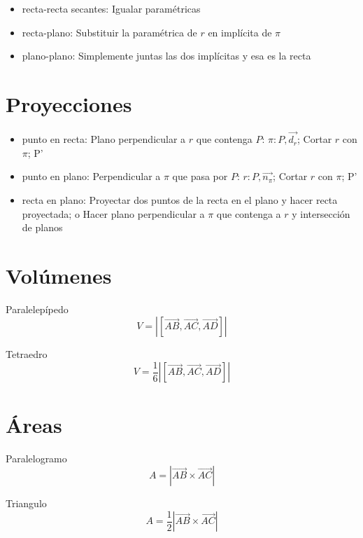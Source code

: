 \documentclass[12pt, letterpaper, twoside]{article}
\begin{document}
	\begin{itemize}
		\item recta-recta secantes:
		Igualar paramétricas
		
		\item recta-plano:
		Substituir la paramétrica de $r$ en implícita de $\pi$
		
		\item plano-plano:
		Simplemente juntas las dos implícitas y esa es la recta
	\end{itemize}

	\section{Proyecciones}
	
	\begin{itemize}
		\item punto en recta:
		Plano perpendicular a $r$ que contenga $P$: $\pi: P, \vec{d_r}$;
		Cortar $r$ con $\pi$; P'
		
		\item punto en plano:
		Perpendicular a $\pi$ que pasa por $P$: $r: P, \vec{n_\pi}$;
		Cortar $r$ con $\pi$; P'
		
		\item recta en plano:
		Proyectar dos puntos de la recta en el plano y hacer recta proyectada; 
		o Hacer plano perpendicular a $\pi$ que contenga a $r$ y intersección de planos
	\end{itemize}


	\section{Volúmenes}

	Paralelepípedo
	\begin{equation}
		V = |[\vec{AB}, \vec{AC}, \vec{AD}]|
	\end{equation}
	
	Tetraedro 
	\begin{equation}
		V = \frac{1}{6} |[\vec{AB}, \vec{AC}, \vec{AD}]|
	\end{equation}


	\section{Áreas}
	
	Paralelogramo
	\begin{equation}
		A = |\vec{AB} \times \vec{AC}|
	\end{equation}
	
	Triangulo
	\begin{equation}
		A = \frac{1}{2} |\vec{AB} \times \vec{AC}|
	\end{equation}
	
\end{document}
